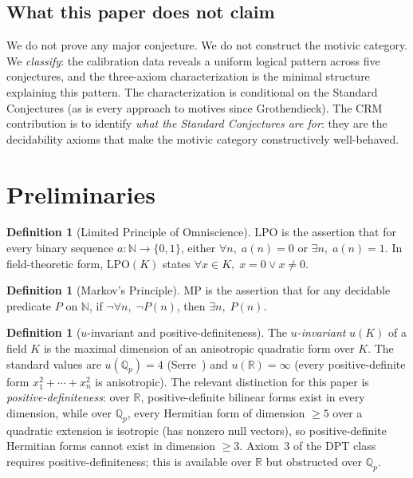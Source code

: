 \documentclass[11pt]{article}
\theoremstyle{definition}
\newtheorem{definition}[theorem]{Definition}
\theoremstyle{remark}
\newcommand{\N}{\mathbb{N}}
\newcommand{\Q}{\mathbb{Q}}
\newcommand{\R}{\mathbb{R}}
\newcommand{\Qp}{\Q_p}
\newcommand{\LPO}{\mathrm{LPO}}
\newcommand{\MP}{\mathrm{MP}}
\newcommand{\CRM}{\mathrm{CRM}}
\begin{document}
\subsection{What this paper does not claim}

We do not prove any major conjecture. We do not construct the motivic category. We \emph{classify}: the calibration data reveals a uniform logical pattern across five conjectures, and the three-axiom characterization is the minimal structure explaining this pattern. The characterization is conditional on the Standard Conjectures (as is every approach to motives since Grothendieck). The $\CRM$ contribution is to identify \emph{what the Standard Conjectures are for}: they are the decidability axioms that make the motivic category constructively well-behaved.

\section{Preliminaries}
\label{sec:prelim}

\begin{definition}[Limited Principle of Omniscience]
$\LPO$ is the assertion that for every binary sequence $a : \N \to \{0,1\}$, either $\forall n,\; a(n) = 0$ or $\exists n,\; a(n) = 1$. In field-theoretic form, $\LPO(K)$ states $\forall x \in K,\; x = 0 \lor x \neq 0$.
\end{definition}

\begin{definition}[Markov's Principle]
$\MP$ is the assertion that for any decidable predicate $P$ on $\N$, if $\lnot\forall n,\;\lnot P(n)$, then $\exists n,\; P(n)$.
\end{definition}

\begin{definition}[$u$-invariant and positive-definiteness]
The \emph{$u$-invariant} $u(K)$ of a field $K$ is the maximal dimension of an anisotropic quadratic form over $K$. The standard values are $u(\Qp) = 4$ (Serre~\cite{Serre1973}) and $u(\R) = \infty$ (every positive-definite form $x_1^2 + \cdots + x_n^2$ is anisotropic). The relevant distinction for this paper is \emph{positive-definiteness}: over $\R$, positive-definite bilinear forms exist in every dimension, while over $\Qp$, every Hermitian form of dimension $\geq 5$ over a quadratic extension is isotropic (has nonzero null vectors), so positive-definite Hermitian forms cannot exist in dimension $\geq 3$. Axiom~3 of the DPT class requires positive-definiteness; this is available over $\R$ but obstructed over $\Qp$.
\end{definition}
\end{document}
